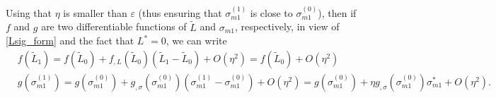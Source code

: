 \documentclass[12pt,reqno]{amsart}
\numberwithin{equation}{section}
\begin{document}
Using that $\eta$ is smaller
than $\varepsilon$ (thus ensuring that $\sigma_{m1}^{(1)}$ is close to $\sigma_{m1}^{(0)}$), then if $f$ and $g$ are two differentiable functions of $\widetilde{L}$ and $\sigma_{m1}$, respectively, in view of \eqref{Lsig_form} and the fact that $L^*=0$, we can write
\begin{equation}\label{fgL0L1}
\begin{split}
& f(\widetilde{L}_1)= f(\widetilde{L}_0)+ f_{,L}(\widetilde{L}_0) (\widetilde{L}_1-\widetilde{L}_0)+O(\eta^2)= f(\widetilde{L}_0)+O(\eta^2)\,\\
& g(\sigma_{m1}^{(1)})= g(\sigma_{m1}^{(0)})+g_{,\sigma}(\sigma_{m1}^{(0)}) (\sigma_{m1}^{(1)}-\sigma_{m1}^{(0)})+O(\eta^2)=g(\sigma_{m1}^{(0)})+\eta g_{,\sigma}(\sigma_{m1}^{(0)}) \sigma_{m1}^{*}+O(\eta^2).
\end{split}
\end{equation}
\end{document}
